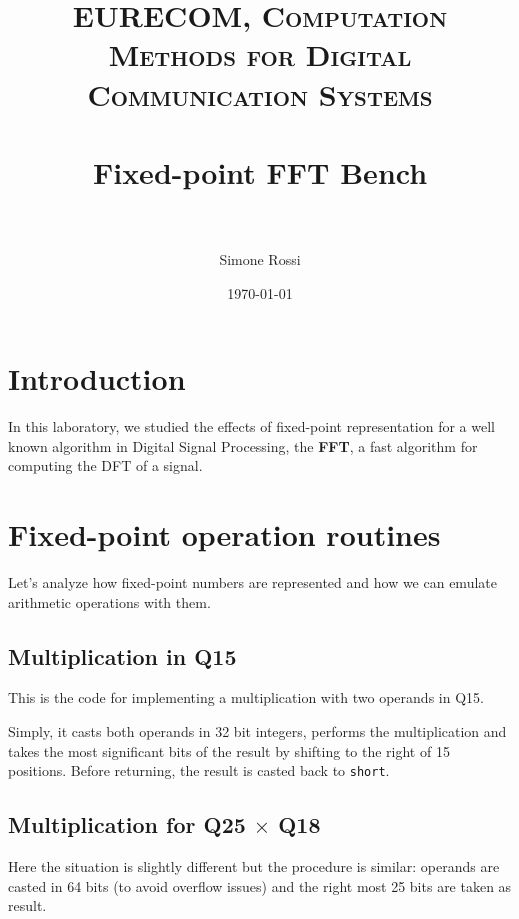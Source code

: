 \documentclass[paper=a4, fontsize=12pt]{scrartcl} %
\title{
\normalfont \normalsize
\textsc{EURECOM, Computation Methods for Digital Communication Systems} \\ [25pt] %
\horrule{0.5pt} \\[0.4cm] %
\huge Fixed-point FFT Bench \\ %
\horrule{2pt} \\[0.5cm] %
}
\author{Simone Rossi} %
\date{\normalsize\today} %
\numberwithin{equation}{section} %
\numberwithin{figure}{section} %
\numberwithin{table}{section} %
\begin{document}
\maketitle %


\section{Introduction}

In this laboratory, we studied the effects of fixed-point representation for a
well known algorithm in Digital Signal Processing, the \textbf{FFT}, a fast algorithm
for computing the DFT of a signal.

\newpage

\section{Fixed-point operation routines}

Let's analyze how fixed-point numbers are represented and how we can emulate
arithmetic operations with them.

\subsection{Multiplication in Q15}

This is the code for implementing a multiplication with two operands in Q15.



Simply, it casts both operands in 32 bit integers, performs the multiplication and
takes the most significant bits of the result by shifting to the right of
15 positions. Before returning, the result is casted back to \texttt{short}.

\subsection{Multiplication for Q25 $\times$ Q18}

Here the situation is slightly different but the procedure is similar: operands
are casted in 64 bits (to avoid overflow issues) and the right most 25 bits are
taken as result.


\end{document}
